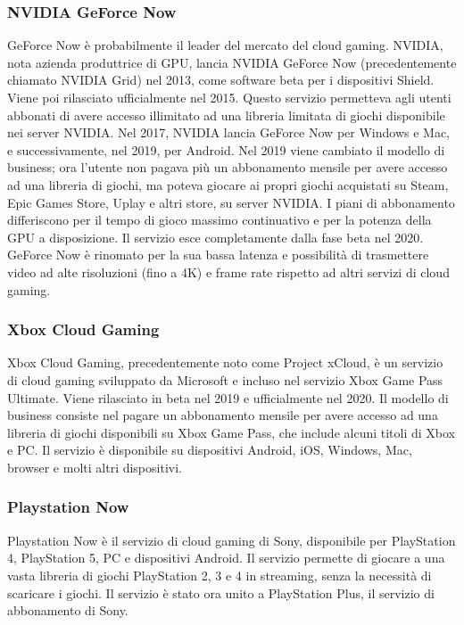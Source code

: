 \documentclass[12pt,a4paper,openright,twoside]{book}
\begin{document}
\subsubsection{NVIDIA GeForce Now}
GeForce Now è probabilmente il leader del mercato del cloud gaming. NVIDIA, nota azienda produttrice di GPU, lancia NVIDIA GeForce Now (precedentemente chiamato NVIDIA Grid) nel 2013, come software beta per i dispositivi Shield. Viene poi rilasciato ufficialmente nel 2015. Questo servizio permetteva agli utenti abbonati di avere accesso illimitato ad una libreria limitata di giochi disponibile nei server NVIDIA.
Nel 2017, NVIDIA lancia GeForce Now per Windows e Mac, e successivamente, nel 2019, per Android. Nel 2019 viene cambiato il modello di business; ora l'utente non pagava più un abbonamento mensile per avere accesso ad una libreria di giochi, ma poteva giocare ai propri giochi acquistati su Steam, Epic Games Store, Uplay e altri store, su server NVIDIA. I piani di abbonamento differiscono per il tempo di gioco massimo continuativo e per la potenza della GPU a disposizione.
Il servizio esce completamente dalla fase beta nel 2020.
GeForce Now è rinomato per la sua bassa latenza e possibilità di trasmettere video ad alte risoluzioni (fino a 4K) e frame rate rispetto ad altri servizi di cloud gaming.

\subsubsection{Xbox Cloud Gaming}
Xbox Cloud Gaming, precedentemente noto come Project xCloud, è un servizio di cloud gaming sviluppato da Microsoft e incluso nel servizio Xbox Game Pass Ultimate. Viene rilasciato in beta nel 2019 e ufficialmente nel 2020. Il modello di business consiste nel pagare un abbonamento mensile per avere accesso ad una libreria di giochi disponibili su Xbox Game Pass, che include alcuni titoli di Xbox e PC. Il servizio è disponibile su dispositivi Android, iOS, Windows, Mac, browser e molti altri dispositivi.

\subsubsection{Playstation Now}
Playstation Now è il servizio di cloud gaming di Sony, disponibile per PlayStation 4, PlayStation 5, PC e dispositivi Android. Il servizio permette di giocare a una vasta libreria di giochi PlayStation 2, 3 e 4 in streaming, senza la necessità di scaricare i giochi. Il servizio è stato ora unito a PlayStation Plus, il servizio di abbonamento di Sony.
\end{document}
